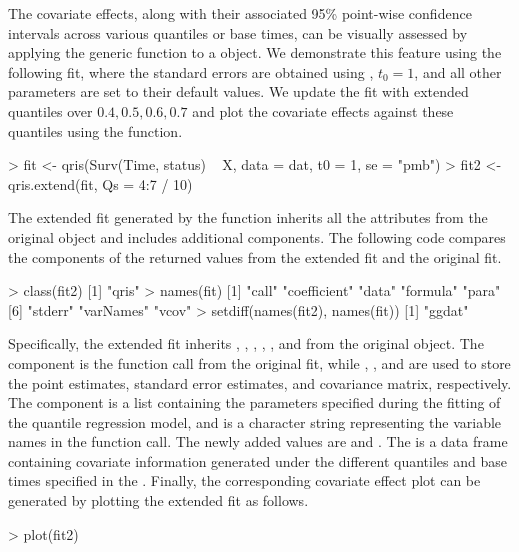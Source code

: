 The covariate effects, along with their associated 95\% point-wise confidence intervals across 
various quantiles or base times, can be visually assessed by applying the generic function 
 to a  object. 
We demonstrate this feature using the following  fit, 
where the standard errors are obtained using , $t_0 = 1$, 
and all other parameters are set to their default values. 
We update the  fit with extended quantiles over ${0.4, 0.5, 0.6, 0.7}$ and 
plot the covariate effects against these quantiles using the  function.
\begin{example}
  > fit <- qris(Surv(Time, status) ~ X, data = dat, t0 = 1, se = "pmb")
  > fit2 <- qris.extend(fit, Qs = 4:7 / 10)
\end{example}
The extended  fit generated by the  function inherits 
all the attributes from the original  object and
includes additional  components.
The following code compares the components of the returned values from the extended  fit
and the original  fit.
\begin{example}
  > class(fit2)
  [1] "qris"
  > names(fit)
  [1] "call"        "coefficient" "data"        "formula"     "para"       
  [6] "stderr"      "varNames"    "vcov"       
  > setdiff(names(fit2), names(fit))
  [1] "ggdat"
\end{example}
Specifically, the extended  fit inherits 
, , , , , and  
from the original  object.
The  component is the function call from the original  fit, 
while , , and  are used to store the point estimates, 
standard error estimates, and covariance matrix, respectively. 
The  component is a list containing the parameters specified during the 
fitting of the quantile regression model, and  is a character string 
representing the variable names in the function call. 
The newly added values are  and . 
The  is a data frame containing covariate information generated under 
the different quantiles and base times specified in the . 
Finally, the corresponding covariate effect plot can be generated by plotting the 
extended  fit as follows.
\begin{example}
  > plot(fit2)
\end{example}

